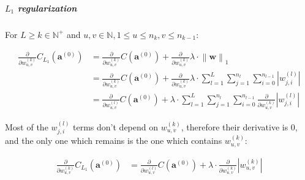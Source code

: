\documentclass[titlepage]{article}
\begin{document}
          \subparagraph{$L_1$ regularization}

            For $L \geq k \in \mathbb{N}^+$ and
            $u, v \in \mathbb{N}, 1 \leq u \leq n_k, v \leq n_{k - 1}$:

            \begin{equation}
              \begin{split}
                \frac{\partial}{\partial w_{u,v}^{(k)}}
                  C_{L_1} \left( \mathbf{a}^{(0)} \right)
                    & = \frac{\partial}{\partial w_{u,v}^{(k)}}
                          C \left( \mathbf{a}^{(0)} \right)
                        +
                        \frac{\partial}{\partial w_{u,v}^{(k)}}
                          \lambda \cdot \left\| \mathbf{w} \right\|_1 \\
                    & = \frac{\partial}{\partial w_{u,v}^{(k)}}
                          C \left( \mathbf{a}^{(0)} \right)
                        +
                        \frac{\partial}{\partial w_{u,v}^{(k)}}
                          \lambda
                          \cdot
                          \sum_{l=1}^L \sum_{j=1}^{n_l} \sum_{i=0}^{n_{l-1}}
                            \left\lvert w_{j,i}^{(l)} \right\rvert \\
                    & = \frac{\partial}{\partial w_{u,v}^{(l)}}
                          C \left( \mathbf{a}^{(0)} \right)
                        +
                        \lambda
                        \cdot
                        \sum_{l=1}^L \sum_{j=1}^{n_l} \sum_{i=0}^{n_{l-1}}
                          \frac{\partial}{\partial w_{u,v}^{(k)}}
                            \left\lvert w_{j,i}^{(l)} \right\rvert
              \end{split}
            \end{equation}

            Most of the $w_{j,i}^{(l)}$ terms don't depend on $w_{u,v}^{(k)}$,
            therefore their derivative is $0$, and the only one which remains is
            the one which contains $w_{u,v}^{(k)}$:

            \begin{equation}
              \begin{split}
                \frac{\partial}{\partial w_{u,v}^{(k)}}
                  C_{L_1} \left( \mathbf{a}^{(0)} \right)
                    & = \frac{\partial}{\partial w_{u,v}^{(l)}}
                          C \left( \mathbf{a}^{(0)} \right)
                        +
                        \lambda
                        \cdot
                        \frac{\partial}{\partial w_{u,v}^{(k)}}
                          \left\lvert w_{u,v}^{(k)} \right\rvert
              \end{split}
            \end{equation}
\end{document}
